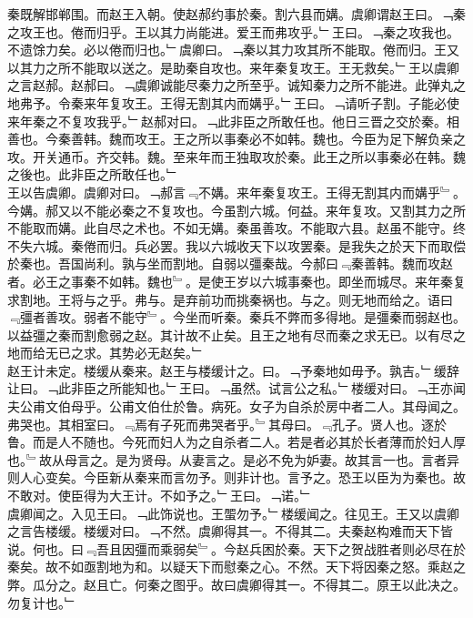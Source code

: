 \documentclass{zhvt-classic}
\begin{document}
\hspace*{2em}秦既解邯郸围。而赵王入朝。使赵郝约事於秦。割六县而媾。虞卿谓赵王曰。﹁秦之攻王也。倦而归乎。王以其力尚能进。爱王而弗攻乎。﹂王曰。﹁秦之攻我也。不遗馀力矣。必以倦而归也。﹂虞卿曰。﹁秦以其力攻其所不能取。倦而归。王又以其力之所不能取以送之。是助秦自攻也。来年秦复攻王。王无救矣。﹂王以虞卿之言赵郝。赵郝曰。﹁虞卿诚能尽秦力之所至乎。诚知秦力之所不能进。此弹丸之地弗予。令秦来年复攻王。王得无割其内而媾乎。﹂王曰。﹁请听子割。子能必使来年秦之不复攻我乎。﹂赵郝对曰。﹁此非臣之所敢任也。他日三晋之交於秦。相善也。今秦善韩。魏而攻王。王之所以事秦必不如韩。魏也。今臣为足下解负亲之攻。开关通币。齐交韩。魏。至来年而王独取攻於秦。此王之所以事秦必在韩。魏之後也。此非臣之所敢任也。﹂\\
\hspace*{2em}王以告虞卿。虞卿对曰。﹁郝言﹃不媾。来年秦复攻王。王得无割其内而媾乎﹄。今媾。郝又以不能必秦之不复攻也。今虽割六城。何益。来年复攻。又割其力之所不能取而媾。此自尽之术也。不如无媾。秦虽善攻。不能取六县。赵虽不能守。终不失六城。秦倦而归。兵必罢。我以六城收天下以攻罢秦。是我失之於天下而取偿於秦也。吾国尚利。孰与坐而割地。自弱以彊秦哉。今郝曰﹃秦善韩。魏而攻赵者。必王之事秦不如韩。魏也﹄。是使王岁以六城事秦也。即坐而城尽。来年秦复求割地。王将与之乎。弗与。是弃前功而挑秦祸也。与之。则无地而给之。语曰﹃彊者善攻。弱者不能守﹄。今坐而听秦。秦兵不弊而多得地。是彊秦而弱赵也。以益彊之秦而割愈弱之赵。其计故不止矣。且王之地有尽而秦之求无已。以有尽之地而给无已之求。其势必无赵矣。﹂\\
\hspace*{2em}赵王计未定。楼缓从秦来。赵王与楼缓计之。曰。﹁予秦地如毋予。孰吉。﹂缓辞让曰。﹁此非臣之所能知也。﹂王曰。﹁虽然。试言公之私。﹂楼缓对曰。﹁王亦闻夫公甫文伯母乎。公甫文伯仕於鲁。病死。女子为自杀於房中者二人。其母闻之。弗哭也。其相室曰。﹃焉有子死而弗哭者乎。﹄其母曰。﹃孔子。贤人也。逐於鲁。而是人不随也。今死而妇人为之自杀者二人。若是者必其於长者薄而於妇人厚也。﹄故从母言之。是为贤母。从妻言之。是必不免为妒妻。故其言一也。言者异则人心变矣。今臣新从秦来而言勿予。则非计也。言予之。恐王以臣为为秦也。故不敢对。使臣得为大王计。不如予之。﹂王曰。﹁诺。﹂\\
\hspace*{2em}虞卿闻之。入见王曰。﹁此饰说也。王蜰勿予。﹂楼缓闻之。往见王。王又以虞卿之言告楼缓。楼缓对曰。﹁不然。虞卿得其一。不得其二。夫秦赵构难而天下皆说。何也。曰﹃吾且因彊而乘弱矣﹄。今赵兵困於秦。天下之贺战胜者则必尽在於秦矣。故不如亟割地为和。以疑天下而慰秦之心。不然。天下将因秦之怒。乘赵之弊。瓜分之。赵且亡。何秦之图乎。故曰虞卿得其一。不得其二。原王以此决之。勿复计也。﹂\\
\end{document}
